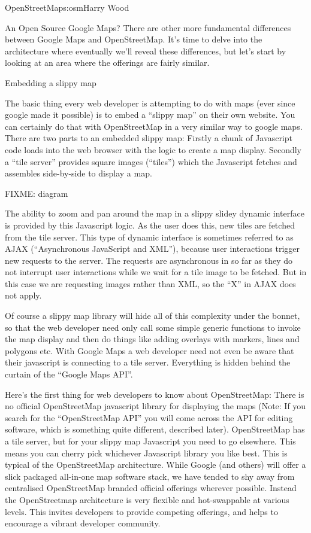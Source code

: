 \begin{aosachapter}{OpenStreetMap}{s:osm}{Harry Wood}
\begin{aosasect1}{An Open Source Google Maps?}
There are other more fundamental differences between Google Maps and
OpenStreetMap. It's time to delve into the architecture where
eventually we'll reveal these differences, but let's start by looking
at an area where the offerings are fairly similar.

\begin{aosasect2}{Embedding a slippy map}

The basic thing every web developer is attempting to do with maps
(ever since google made it possible) is to embed a ``slippy map'' on
their own website. You can certainly do that with OpenStreetMap in a
very similar way to google maps. There are two parts to an embedded
slippy map: Firstly a chunk of Javascript code loads into the web
browser with the logic to create a map display. Secondly a ``tile
server'' provides square images (``tiles'') which the Javascript
fetches and assembles side-by-side to display a map.

FIXME: diagram

The ability to zoom and pan around the map in a slippy slidey dynamic
interface is provided by this Javascript logic. As the user does this,
new tiles are fetched from the tile server. This type of dynamic
interface is sometimes referred to as AJAX (``Asynchronous JavaScript
and XML''), because user interactions trigger new requests to the
server. The requests are asynchronous in so far as they do not
interrupt user interactions while we wait for a tile image to be
fetched. But in this case we are requesting images rather than XML, so
the ``X'' in AJAX does not apply.

Of course a slippy map library will hide all of this complexity under
the bonnet, so that the web developer need only call some simple
generic functions to invoke the map display and then do things like
adding overlays with markers, lines and polygons etc. With Google Maps
a web developer need not even be aware that their javascript is
connecting to a tile server. Everything is hidden behind the curtain
of the ``Google Maps API''.

Here's the first thing for web developers to know about OpenStreetMap:
There is no official OpenStreetMap javascript library for displaying
the maps (Note: If you search for the ``OpenStreetMap API'' you will
come across the API for editing software, which is something quite
different, described later). OpenStreetMap has a tile server, but for
your slippy map Javascript you need to go elsewhere. This means you
can cherry pick whichever Javascript library you like best. This is
typical of the OpenStreetMap architecture. While Google (and others)
will offer a slick packaged all-in-one map software stack, we have
tended to shy away from centralised OpenStreetMap branded official
offerings wherever possible. Instead the OpenStreetmap architecture is
very flexible and hot-swappable at various levels. This invites
developers to provide competing offerings, and helps to encourage a
vibrant developer community.


\end{aosasect2}
\end{aosasect1}
\end{aosachapter}
